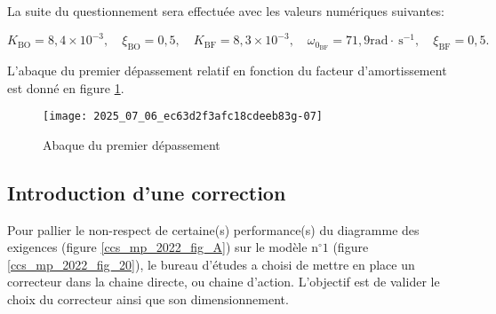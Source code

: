
La suite du questionnement sera effectuée avec les valeurs numériques suivantes:

$$
K_{\mathrm{BO}}=8,4 \times 10^{-3}, \quad \xi_{\mathrm{BO}}=0,5, \quad K_{\mathrm{BF}}=8,3 \times 10^{-3}, \quad \omega_{0_{\mathrm{BF}}}=71,9 \mathrm{rad} \cdot \mathrm{~s}^{-1}, \quad \xi_{\mathrm{BF}}=0,5 .
$$

L'abaque du premier dépassement relatif en fonction du facteur d'amortissement est donné en figure \ref{ccs_mp_2022_fig_09}.





\begin{figure}[!h]
\centering
\texttt{[image: 2025\_07\_06\_ec63d2f3afc18cdeeb83g-07]}
\caption{\label{ccs_mp_2022_fig_09}Abaque du premier dépassement}
\end{figure}


\subsection{Introduction d'une correction \label{ccs_mp_2022_sec_3B}}

\begin{obj}
Pour pallier le non-respect de certaine(s) performance(s) du diagramme des exigences (figure \ref{ccs_mp_2022_fig_A}) sur le modèle $\mathrm{n}^{\circ} 1$ (figure \ref{ccs_mp_2022_fig_20}), le bureau d'études a choisi de mettre en place un correcteur dans la chaine directe, ou chaine d'action. L'objectif est de valider le choix du correcteur ainsi que son dimensionnement.
\end{obj}

